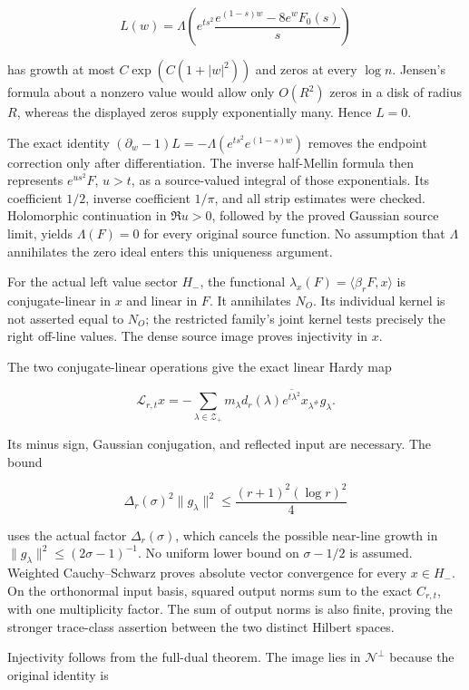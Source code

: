 \documentclass[
]{article}
\begin{document}
\[
L(w)=\Lambda\left(e^{ts^2}
\frac{e^{(1-s)w}-8e^wF_0(s)}s\right)
\]

has growth at most \(C\exp(C(1+|w|^2))\) and zeros at every \(\log n\). Jensen's formula about a nonzero value would allow only \(O(R^2)\) zeros in a disk of radius \(R\), whereas the displayed zeros supply exponentially many. Hence \(L=0\).

The exact identity \((\partial_w-1)L=-\Lambda(e^{ts^2}e^{(1-s)w})\) removes the endpoint correction only after differentiation. The inverse half-Mellin formula then represents \(e^{us^2}F\), \(u>t\), as a source-valued integral of those exponentials. Its coefficient \(1/2\), inverse coefficient \(1/\pi\), and all strip estimates were checked. Holomorphic continuation in \(\Re u>0\), followed by the proved Gaussian source limit, yields \(\Lambda(F)=0\) for every original source function. No assumption that \(\Lambda\) annihilates the zero ideal enters this uniqueness argument.

For the actual left value sector \(H_-\), the functional \(\lambda_x(F)=\langle\beta_rF,x\rangle\) is conjugate-linear in \(x\) and linear in \(F\). It annihilates \(N_O\). Its individual kernel is not asserted equal to \(N_O\); the restricted family's joint kernel tests precisely the right off-line values. The dense source image proves injectivity in \(x\).

The two conjugate-linear operations give the exact linear Hardy map

\[
\mathcal L_{r,t}x
=-\sum_{\lambda\in\mathscr Z_+}
m_\lambda d_r(\lambda)\overline{e^{t\lambda^2}}
x_{\lambda^\#}g_\lambda.
\]

Its minus sign, Gaussian conjugation, and reflected input are necessary. The bound

\[
\Delta_r(\sigma)^2\|g_\lambda\|^2
\le \frac{(r+1)^2(\log r)^2}{4}
\]

uses the actual factor \(\Delta_r(\sigma)\), which cancels the possible near-line growth in \(\|g_\lambda\|^2\le(2\sigma-1)^{-1}\). No uniform lower bound on \(\sigma-1/2\) is assumed. Weighted Cauchy--Schwarz proves absolute vector convergence for every \(x\in H_-\). On the orthonormal input basis, squared output norms sum to the exact \(C_{r,t}\), with one multiplicity factor. The sum of output norms is also finite, proving the stronger trace-class assertion between the two distinct Hilbert spaces.

Injectivity follows from the full-dual theorem. The image lies in \(\mathcal N^\perp\) because the original identity is
\end{document}
